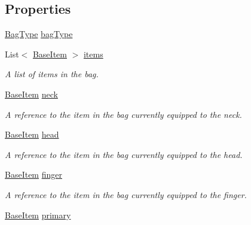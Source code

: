 \subsection*{Properties}
\begin{DoxyCompactItemize}
\item 
\mbox{\hyperlink{class_bag_a5a827c44705d57202edc93b9a39316c7}{Bag\+Type}} \mbox{\hyperlink{class_bag_a84ac63a7f36a20bc22ab8c2de86babcc}{bag\+Type}}
\item 
List$<$ \mbox{\hyperlink{class_base_item}{Base\+Item}} $>$ \mbox{\hyperlink{class_bag_a06d313b5ecfa35740d11e1613d1a7695}{items}}
\begin{DoxyCompactList}\small\item\em A list of items in the bag. \end{DoxyCompactList}\item 
\mbox{\hyperlink{class_base_item}{Base\+Item}} \mbox{\hyperlink{class_bag_a6796ecd4f3c30c4514d45cce11b1907c}{neck}}
\begin{DoxyCompactList}\small\item\em A reference to the item in the bag currently equipped to the neck. \end{DoxyCompactList}\item 
\mbox{\hyperlink{class_base_item}{Base\+Item}} \mbox{\hyperlink{class_bag_aad83c56a14d611f6e1d2fac81903d66c}{head}}
\begin{DoxyCompactList}\small\item\em A reference to the item in the bag currently equipped to the head. \end{DoxyCompactList}\item 
\mbox{\hyperlink{class_base_item}{Base\+Item}} \mbox{\hyperlink{class_bag_a0517877fdabd6917389995deecabe057}{finger}}
\begin{DoxyCompactList}\small\item\em A reference to the item in the bag currently equipped to the finger. \end{DoxyCompactList}\item 
\mbox{\hyperlink{class_base_item}{Base\+Item}} \mbox{\hyperlink{class_bag_af0d1113dd35f217846e53dd477071db1}{primary}}

\end{DoxyCompactItemize}
